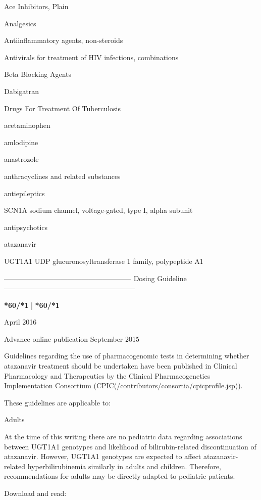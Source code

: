 \documentclass{resume} %
\begin{document}
\begin{rSection}{ Ace Inhibitors, Plain }
\begin{rSection}{ Analgesics }
\begin{rSection}{ Antiinflammatory agents, non-steroids }
\begin{rSection}{ Antivirals for treatment of HIV infections, combinations }
\begin{rSection}{ Beta Blocking Agents }
\begin{rSection}{ Dabigatran }
\begin{rSection}{ Drugs For Treatment Of Tuberculosis }
\begin{rSection}{ acetaminophen }
\begin{rSection}{ amlodipine }
\begin{rSection}{ anastrozole }
\begin{rSection}{ anthracyclines and related substances }
\begin{rSection}{ antiepileptics }
\begin{rSubsection}{ SCN1A }{ sodium channel, voltage-gated, type I, alpha subunit }{}{}
\end{rSubsection}
\end{rSection}\begin{rSection}{ antipsychotics }
\item[]
\begin{rSection}{ atazanavir }
\item[]
\begin{rSubsection}{ UGT1A1 }{ UDP glucuronosyltransferase 1 family, polypeptide A1 }{}{}
\item[]
\item[] ------------------------------------------------------ Dosing Guideline --------------------------------------------------------\newline
\item[]
\item[] \textbf{ *60/*1 } | \textbf{ *60/*1 }
\item April 2016
 \newline
\item Advance online publication September 2015
 \newline
\item Guidelines regarding the use of pharmacogenomic tests in determining whether atazanavir treatment should be undertaken have been published in Clinical Pharmacology and Therapeutics by the Clinical Pharmacogenetics Implementation Consortium (CPIC(/contributors/consortia/cpicprofile.jsp)).
 \newline
\item These guidelines are applicable to:
 \newline
\item Adults
 \newline
\item At the time of this writing there are no pediatric data regarding associations between UGT1A1 genotypes and likelihood of bilirubin-related discontinuation of atazanavir. However, UGT1A1 genotypes are expected to affect atazanavir-related hyperbilirubinemia similarly in adults and children. Therefore, recommendations for adults may be directly adapted to pediatric patients.
 \newline
\item Download and read:
 \newline

\end{rSubsection}
\end{rSection}
\end{rSection}
\end{rSection}
\end{rSection}
\end{rSection}
\end{rSection}
\end{rSection}
\end{rSection}
\end{rSection}
\end{rSection}
\end{rSection}
\end{rSection}
\end{rSection}
\end{document}
